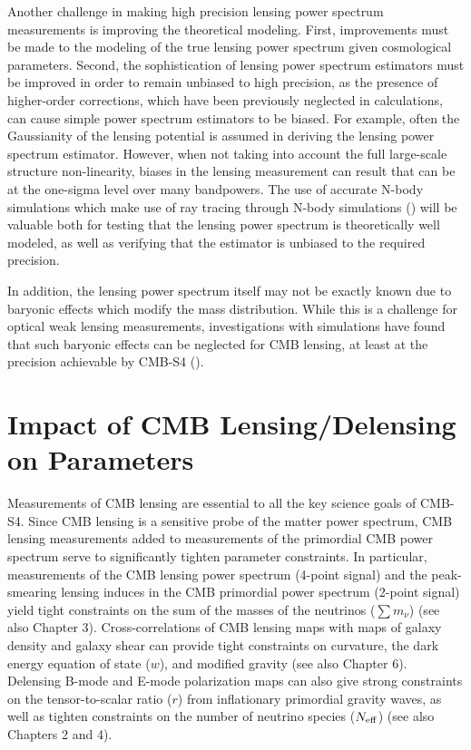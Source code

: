 Another challenge in making high precision lensing power spectrum measurements is improving the theoretical modeling. First, improvements must be made to the modeling of the true lensing power spectrum given cosmological parameters. Second, the sophistication of lensing power spectrum estimators must be improved in order to remain unbiased to high precision, as the presence of higher-order corrections, which have been previously neglected in calculations, can cause simple power spectrum estimators to be biased. For example, often the Gaussianity of the lensing potential is assumed in deriving the lensing power spectrum estimator.  However, when not taking into account the full large-scale structure non-linearity, biases in the lensing measurement can result that can be at the one-sigma level over many bandpowers.  The use of accurate N-body simulations which make use of ray tracing through N-body simulations (\cite{Calabrese:2014gla}) will be valuable both for testing that the lensing power spectrum is theoretically well modeled, as well as verifying that the estimator is unbiased to the required precision.

In addition, the lensing power spectrum itself may not be exactly known due to baryonic effects which modify the mass distribution. While this is a challenge for optical weak lensing measurements, investigations with simulations have found that such baryonic effects can be neglected for CMB lensing, at least at the precision achievable by CMB-S4 (\cite{Natarajan:2014xba}).

\section{Impact of CMB Lensing/Delensing on Parameters}\label{forecasts}

Measurements of CMB lensing are essential to all the key science goals of CMB-S4.  Since CMB lensing is a sensitive probe of the matter power spectrum, CMB lensing measurements added to measurements of the primordial CMB power spectrum serve to significantly tighten parameter constraints.  In particular, measurements of the CMB lensing power spectrum (4-point signal) and the peak-smearing lensing induces in the CMB primordial power spectrum (2-point signal) yield tight constraints on the sum of the masses of the neutrinos ($\sum {m_\nu}$) (see also Chapter 3).  Cross-correlations of CMB lensing maps with maps of galaxy density and galaxy shear can provide tight constraints on curvature, the dark energy equation of state ($w$), and modified gravity (see also Chapter 6).  Delensing B-mode and E-mode polarization maps can also give strong constraints on the tensor-to-scalar ratio ($r$) from inflationary primordial gravity waves, as well as tighten constraints on the number of neutrino species ($N_{\rm{eff}}$) (see also Chapters 2 and 4).  

